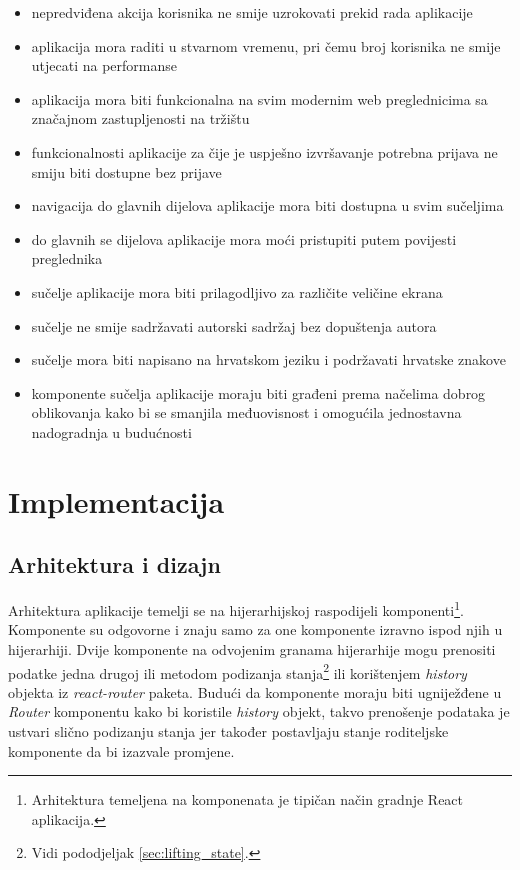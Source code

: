 \documentclass[times, utf8, zavrsni, numeric]{fer}
\newcommand{\razmaks}{\vspace{10pt}}
\begin{document}
\razmaks
\begin{itemize}
  \item nepredviđena akcija korisnika ne smije uzrokovati prekid rada aplikacije
  \item aplikacija mora raditi u stvarnom vremenu, pri čemu broj korisnika ne smije utjecati na performanse
  \item aplikacija mora biti funkcionalna na svim modernim web preglednicima sa značajnom zastupljenosti na tržištu
  \item funkcionalnosti aplikacije za čije je uspješno izvršavanje potrebna prijava ne smiju biti dostupne bez prijave
  \item navigacija do glavnih dijelova aplikacije mora biti dostupna u svim sučeljima
  \item do glavnih se dijelova aplikacije mora moći pristupiti putem povijesti preglednika
  \item sučelje aplikacije mora biti prilagodljivo za različite veličine ekrana
  \item sučelje ne smije sadržavati autorski sadržaj bez dopuštenja autora
  \item sučelje mora biti napisano na hrvatskom jeziku i podržavati hrvatske znakove
  \item komponente sučelja aplikacije moraju biti građeni prema načelima dobrog oblikovanja kako bi se smanjila međuovisnost i omogućila jednostavna nadogradnja u budućnosti
\end{itemize}


\chapter{Implementacija}


\section{Arhitektura i dizajn}

Arhitektura aplikacije temelji se na hijerarhijskoj raspodijeli komponenti\footnote{Arhitektura temeljena na komponenata  je tipičan način gradnje React aplikacija\citep{understandingCBA}.}.
Komponente su odgovorne i znaju samo za one komponente izravno ispod njih u hijerarhiji.
Dvije komponente na odvojenim granama hijerarhije mogu prenositi podatke jedna drugoj ili metodom podizanja stanja\footnote{Vidi pododjeljak \ref{sec:lifting_state}.} ili korištenjem \emph{history} objekta iz \emph{react-router} paketa.
Budući da komponente moraju biti ugniježđene u \emph{Router} komponentu kako bi koristile \emph{history} objekt, takvo prenošenje podataka je ustvari slično podizanju stanja jer također postavljaju stanje roditeljske komponente da bi izazvale promjene. 
\end{document}
